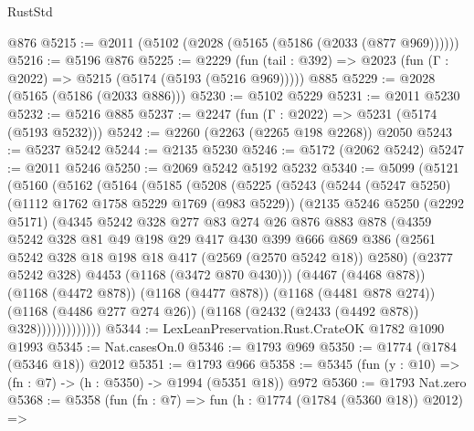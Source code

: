 \begin{lexlean}{RustStd}
\begin{coremodule}
    @876
@5215 := @2011 (@5102 (@2028 (@5165 (@5186 (@2033 (@877 @969))))))
@5216 := @5196 @876
@5225 := @2229
    (fun (tail : @392) => @2023 (fun (Γ : @2022) => @5215 (@5174 (@5193 (@5216 @969)))))
    @885
@5229 := @2028 (@5165 (@5186 (@2033 @886)))
@5230 := @5102 @5229
@5231 := @2011 @5230
@5232 := @5216 @885
@5237 := @2247 (fun (Γ : @2022) => @5231 (@5174 (@5193 @5232)))
@5242 := @2260 (@2263 (@2265 @198 @2268)) @2050
@5243 := @5237 @5242
@5244 := @2135 @5230
@5246 := @5172 (@2062 @5242)
@5247 := @2011 @5246
@5250 := @2069 @5242 @5192 @5232
@5340 := @5099
    (@5121
      (@5160
        (@5162
          (@5164
            (@5185
              (@5208
                (@5225
                  (@5243
                    (@5244
                      (@5247 @5250)
                      (@1112 @1762 @1758 @5229 @1769 (@983 @5229))
                      (@2135
                        @5246
                        @5250
                        (@2292 @5171)
                        (@4345
                          @5242
                          @328
                          @277
                          @83
                          @274
                          @26
                          @876
                          @883
                          @878
                          (@4359
                            @5242
                            @328
                            @81
                            @49
                            @198
                            @29
                            @417
                            @430
                            @399
                            @666
                            @869
                            @386
                            (@2561 @5242 @328 @18 @198 @18 @417 (@2569 (@2570 @5242 @18)) @2580)
                            (@2377 @5242 @328)
                            @4453
                            (@1168 (@3472 @870 @430)))
                          (@4467 (@4468 @878))
                          (@1168 (@4472 @878))
                          (@1168 (@4477 @878))
                          (@1168 (@4481 @878 @274))
                          (@1168 (@4486 @277 @274 @26))
                          (@1168 (@2432 (@2433 (@4492 @878)) @328)))))))))))))
@5344 := LexLeanPreservation.Rust.CrateOK @1782 @1090 @1993
@5345 := Nat.casesOn.{0}
@5346 := @1793 @969
@5350 := @1774 (@1784 (@5346 @18)) @2012
@5351 := @1793 @966
@5358 := @5345 (fun (y : @10) => (fn : @7) -> (h : @5350) -> @1994 (@5351 @18)) @972
@5360 := @1793 Nat.zero
@5368 := @5358
    (fun (fn : @7) =>
    fun (h : @1774 (@1784 (@5360 @18)) @2012) =>

\end{coremodule}
\end{lexlean}
